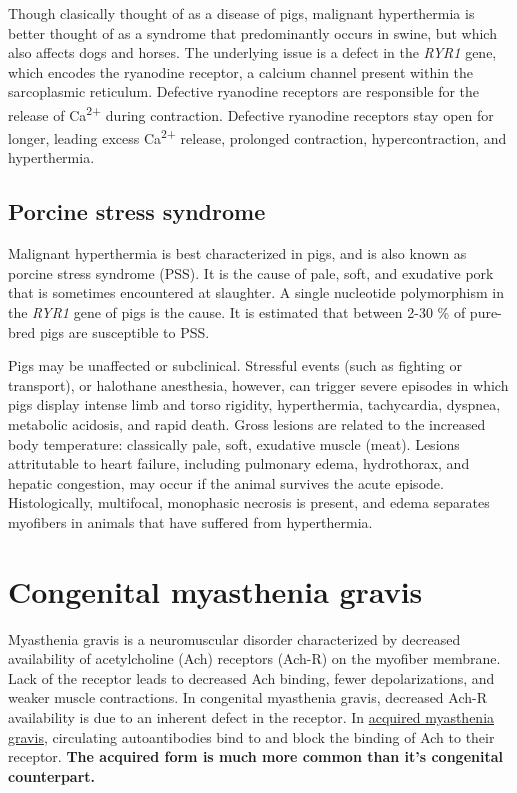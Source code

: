 \documentclass[openany]{report}
\begin{document}
Though clasically thought of as a disease of pigs, malignant
hyperthermia is better thought of as a syndrome that predominantly
occurs in swine, but which also affects dogs and horses. The underlying
issue is a defect in the \emph{RYR1} gene, which encodes the ryanodine
receptor, a calcium channel present within the sarcoplasmic reticulum.
Defective ryanodine receptors are responsible for the release of
Ca\textsuperscript{2+} during contraction. Defective ryanodine receptors
stay open for longer, leading excess Ca\textsuperscript{2+} release,
prolonged contraction, hypercontraction, and hyperthermia.

\subsection{Porcine stress syndrome}\label{porcine-stress-syndrome}

Malignant hyperthermia is best characterized in pigs, and is also known
as porcine stress syndrome (PSS). It is the cause of pale, soft, and
exudative pork that is sometimes encountered at slaughter. A single
nucleotide polymorphism in the \emph{RYR1} gene of pigs is the cause. It
is estimated that between 2-30 \% of pure-bred pigs are susceptible to
PSS.

Pigs may be unaffected or subclinical. Stressful events (such as
fighting or transport), or halothane anesthesia, however, can trigger
severe episodes in which pigs display intense limb and torso rigidity,
hyperthermia, tachycardia, dyspnea, metabolic acidosis, and rapid death.
Gross lesions are related to the increased body temperature: classically
pale, soft, exudative muscle (meat). Lesions attritutable to heart
failure, including pulmonary edema, hydrothorax, and hepatic congestion,
may occur if the animal survives the acute episode. Histologically,
multifocal, monophasic necrosis is present, and edema separates
myofibers in animals that have suffered from hyperthermia.

\hypertarget{congenital-myasthenia-gravis}{\section{Congenital
myasthenia gravis}\label{congenital-myasthenia-gravis}}

Myasthenia gravis is a neuromuscular disorder characterized by decreased
availability of acetylcholine (Ach) receptors (Ach-R) on the myofiber
membrane. Lack of the receptor leads to decreased Ach binding, fewer
depolarizations, and weaker muscle contractions. In congenital
myasthenia gravis, decreased Ach-R availability is due to an inherent
defect in the receptor. In
\protect\hyperlink{acquired-myasthenia-gravis}{acquired myasthenia
gravis}, circulating autoantibodies bind to and block the binding of Ach
to their receptor. \textbf{The acquired form is much more common than
it's congenital counterpart.}
\end{document}
